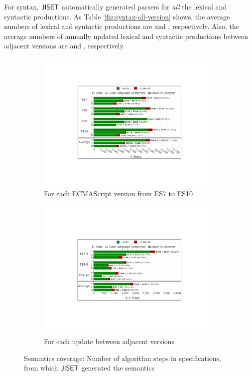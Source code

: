 For syntax, \( \text{\sf JISET} \) automatically generated parsers for \textit{all} the
lexical and syntactic productions.  As Table~\ref{fig:syntax-all-version} shows,
the average numbers of lexical and syntactic productions are  and
, respectively.  Also, the average numbers of annually updated
lexical and syntactic productions between adjacent versions are  and
, respectively.

\begin{figure}[t]
  \centering
  \begin{subfigure}{0.48\textwidth}
    \includegraphics[width=\textwidth]{img/sem-all.pdf}
    \caption{For each ECMAScript version from ES7 to ES10}
\vspace*{.5em}
    \label{fig:semantics-all-version}
  \end{subfigure}
  \hfill
  \begin{subfigure}{0.48\textwidth}
    \includegraphics[width=\textwidth]{img/sem-update.pdf}
    \caption{For each update between adjacent versions}
    \label{fig:semantics-all-version-update}
  \end{subfigure}
\vspace*{-.5em}
\caption{Semantics coverage: Number of algorithm steps in specifications,
from which \( \text{\sf JISET} \) generated the semantics}
  \label{fig:all-version}
\vspace*{-1em}
\end{figure}

